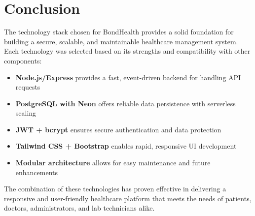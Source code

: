 \section{Conclusion}
The technology stack chosen for BondHealth provides a solid foundation for building a secure, scalable, and maintainable healthcare management system. Each technology was selected based on its strengths and compatibility with other components:

\begin{itemize}
    \item \textbf{Node.js/Express} provides a fast, event-driven backend for handling API requests
    \item \textbf{PostgreSQL with Neon} offers reliable data persistence with serverless scaling
    \item \textbf{JWT + bcrypt} ensures secure authentication and data protection
    \item \textbf{Tailwind CSS + Bootstrap} enables rapid, responsive UI development
    \item \textbf{Modular architecture} allows for easy maintenance and future enhancements
\end{itemize}

The combination of these technologies has proven effective in delivering a responsive and user-friendly healthcare platform that meets the needs of patients, doctors, administrators, and lab technicians alike.